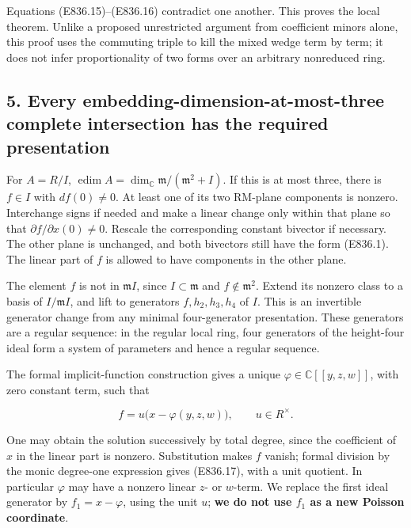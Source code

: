 Equations (E836.15)--(E836.16) contradict one another. This proves the
local theorem. Unlike a proposed unrestricted argument from coefficient
minors alone, this proof uses the commuting triple to kill the mixed
wedge term by term; it does not infer proportionality of two forms over
an arbitrary nonreduced ring.

\subsection{5. Every embedding-dimension-at-most-three complete
intersection has the required
presentation}\label{every-embedding-dimension-at-most-three-complete-intersection-has-the-required-presentation}

For \(A=R/I\),
\(\operatorname{edim}A=\dim_{\mathbb C}\mathfrak m/(\mathfrak m^2+I)\).
If this is at most three, there is \(f\in I\) with \(df(0)\ne0\). At
least one of its two RM-plane components is nonzero. Interchange signs
if needed and make a linear change only within that plane so that
\(\partial f/\partial x(0)\ne0\). Rescale the corresponding constant
bivector if necessary. The other plane is unchanged, and both bivectors
still have the form (E836.1). The linear part of \(f\) is allowed to
have components in the other plane.

The element \(f\) is not in \(\mathfrak m I\), since
\(I\subset\mathfrak m\) and \(f\notin\mathfrak m^2\). Extend its nonzero
class to a basis of \(I/\mathfrak m I\), and lift to generators
\(f,h_2,h_3,h_4\) of \(I\). This is an invertible generator change from
any minimal four-generator presentation. These generators are a regular
sequence: in the regular local ring, four generators of the height-four
ideal form a system of parameters and hence a regular sequence.

The formal implicit-function construction gives a unique
\(\varphi\in\mathbb C[[y,z,w]]\), with zero constant term, such that

\[
 f=u\bigl(x-\varphi(y,z,w)\bigr),\qquad u\in R^\times.
 \tag{E836.17}
\]

One may obtain the solution successively by total degree, since the
coefficient of \(x\) in the linear part is nonzero. Substitution makes
\(f\) vanish; formal division by the monic degree-one expression gives
(E836.17), with a unit quotient. In particular \(\varphi\) may have a
nonzero linear \(z\)- or \(w\)-term. We replace the first ideal
generator by \(f_1=x-\varphi\), using the unit \(u\); \textbf{we do not
use \(f_1\) as a new Poisson coordinate}.

